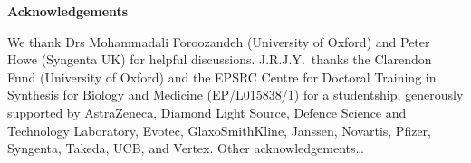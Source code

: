 \documentclass[11pt]{article}
\begin{document}
\begin{refsection}

\textbf{\Large Acknowledgements}

We thank Drs Mohammadali Foroozandeh (University of Oxford) and Peter Howe (Syngenta UK) for helpful discussions.
J.R.J.Y.\ thanks the Clarendon Fund (University of Oxford) and the EPSRC Centre for Doctoral Training in Synthesis for Biology and Medicine (EP/L015838/1) for a studentship, generously supported by AstraZeneca, Diamond Light Source, Defence Science and Technology Laboratory, Evotec, GlaxoSmithKline, Janssen, Novartis, Pfizer, Syngenta, Takeda, UCB, and Vertex.
Other acknowledgements\ldots

\printbibliography
\end{refsection}
\begin{refsection}

\end{refsection}
\end{document}

